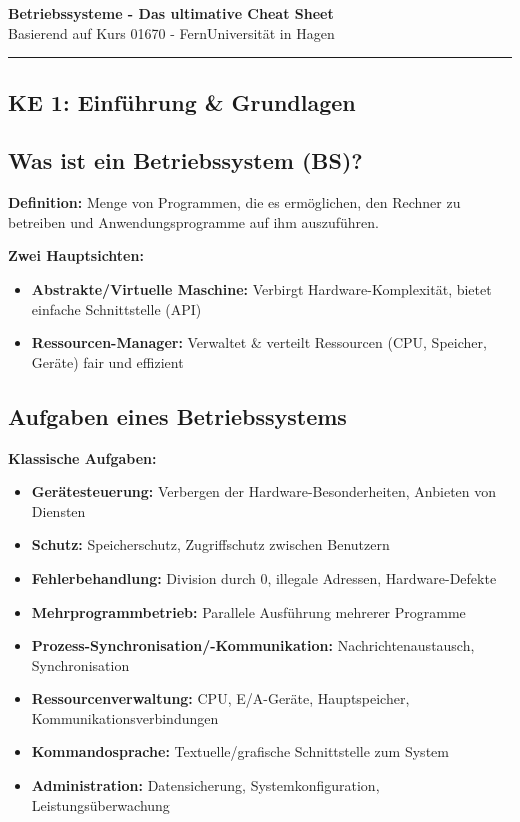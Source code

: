 \documentclass[9pt,a4paper]{extarticle}
\begin{document}
\begin{center}
{\huge\textbf{Betriebssysteme - Das ultimative Cheat Sheet}}\\
\vspace{2mm}
{\large Basierend auf Kurs 01670 - FernUniversität in Hagen}
\end{center}

\vspace{3mm}
\hrule
\vspace{3mm}

\begin{multicols*}{2}
\small

\section{KE 1: Einführung \& Grundlagen}

\subsection{Was ist ein Betriebssystem (BS)?}
\textbf{Definition:} Menge von Programmen, die es ermöglichen, den Rechner zu betreiben und Anwendungsprogramme auf ihm auszuführen.

\textbf{Zwei Hauptsichten:}
\begin{itemize}
\item \textbf{Abstrakte/Virtuelle Maschine:} Verbirgt Hardware-Komplexität, bietet einfache Schnittstelle (API)
\item \textbf{Ressourcen-Manager:} Verwaltet \& verteilt Ressourcen (CPU, Speicher, Geräte) fair und effizient
\end{itemize}

\subsection{Aufgaben eines Betriebssystems}
\textbf{Klassische Aufgaben:}
\begin{itemize}
\item \textbf{Gerätesteuerung:} Verbergen der Hardware-Besonderheiten, Anbieten von Diensten
\item \textbf{Schutz:} Speicherschutz, Zugriffschutz zwischen Benutzern
\item \textbf{Fehlerbehandlung:} Division durch 0, illegale Adressen, Hardware-Defekte
\item \textbf{Mehrprogrammbetrieb:} Parallele Ausführung mehrerer Programme
\item \textbf{Prozess-Synchronisation/-Kommunikation:} Nachrichtenaustausch, Synchronisation
\item \textbf{Ressourcenverwaltung:} CPU, E/A-Geräte, Hauptspeicher, Kommunikationsverbindungen
\item \textbf{Kommandosprache:} Textuelle/grafische Schnittstelle zum System
\item \textbf{Administration:} Datensicherung, Systemkonfiguration, Leistungsüberwachung
\end{itemize}


\end{multicols*}
\end{document}
